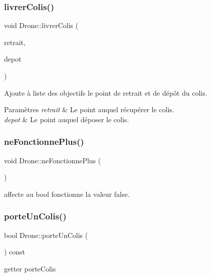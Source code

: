 \subsubsection{\texorpdfstring{livrer\+Colis()}{livrerColis()}}
{\footnotesize\ttfamily void Drone\+::livrer\+Colis (\begin{DoxyParamCaption}\item[{const \mbox{\hyperlink{class_vecteur_r3}{Vecteur\+R3}} \&}]{retrait,  }\item[{const \mbox{\hyperlink{class_vecteur_r3}{Vecteur\+R3}} \&}]{depot }\end{DoxyParamCaption})}

Ajoute à liste des objectifs le point de retrait et de dépôt du colis. 
\begin{DoxyParams}{Paramètres}
{\em retrait} & Le point auquel récupérer le colis. \\
\hline
{\em depot} & Le point auquel déposer le colis. \\
\hline
\end{DoxyParams}
\mbox{\label{class_drone_a0e15629285db6c6c9f1b21ce138bf6ec}} 
\subsubsection{\texorpdfstring{ne\+Fonctionne\+Plus()}{neFonctionnePlus()}}
{\footnotesize\ttfamily void Drone\+::ne\+Fonctionne\+Plus (\begin{DoxyParamCaption}{ }\end{DoxyParamCaption})}

affecte au bool \textquotesingle{}fonctionne\textquotesingle{} la valeur false. \mbox{\label{class_drone_aaa8aa9eedb05b4c46bd92e88d5f14441}} 
\subsubsection{\texorpdfstring{porte\+Un\+Colis()}{porteUnColis()}}
{\footnotesize\ttfamily bool Drone\+::porte\+Un\+Colis (\begin{DoxyParamCaption}{ }\end{DoxyParamCaption}) const}

getter porte\+Colis \mbox{\label{class_drone_a75aaefd8ca47db757ad38a10482aa042}} 
